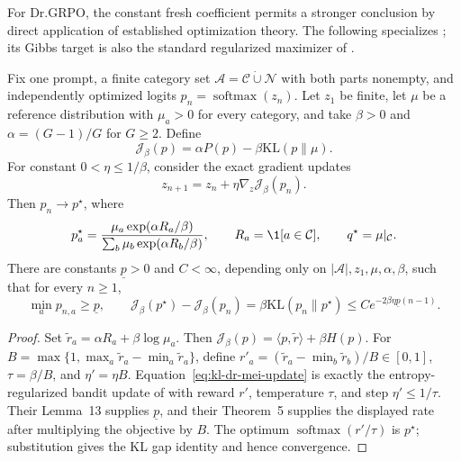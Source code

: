 For Dr.GRPO, the constant fresh coefficient permits a stronger conclusion
by direct application of established optimization theory. The following
specializes \citet[Theorem~5 and Lemma~13]{mei2020softmaxpg}; its Gibbs
target is also the standard regularized maximizer of
\citet[Proposition~1]{geist2019regmdp}.

\begin{corollary}
\enforcehalffinalproseline
\label{cor:kl-dr-mei-convergence}
Fix one prompt, a finite category set
$\mathcal A=\mathcal C\mathbin{\dot\cup}\mathcal N$ with both parts
nonempty, and independently optimized logits $p_n=\operatorname{softmax}(z_n)$.
Let $z_1$ be finite, let $\mu$ be a reference distribution with
$\mu_a>0$ for every category, and take $\beta>0$ and
$\alpha=(G-1)/G$ for $G\ge2$. Define
\[
 \mathcal J_\beta(p)=\alpha P(p)-\beta\mathrm{KL}(p\|\mu).
\]
For constant $0<\eta\le1/\beta$, consider the exact gradient updates
\begin{equation}
 z_{n+1}=z_n+\eta\nabla_z\mathcal J_\beta(p_n).
 \label{eq:kl-dr-mei-update}
\end{equation}
Then $p_n\to p^\star$, where
\[
 p^\star_a=
 \frac{\mu_a\exp(\alpha R_a/\beta)}
      {\sum_b\mu_b\exp(\alpha R_b/\beta)},
 \qquad R_a=\1[a\in\mathcal C],
 \qquad q^\star=\mu|_{\mathcal C}.
\]
There are constants $\underline p>0$ and $C<\infty$, depending only on
$|\mathcal A|,z_1,\mu,\alpha,\beta$, such that for every $n\ge1$,
\begin{equation}
 \min_a p_{n,a}\ge\underline p,
 \qquad
 \mathcal J_\beta(p^\star)-\mathcal J_\beta(p_n)
 =\beta\mathrm{KL}(p_n\|p^\star)
 \le C e^{-2\beta\eta\underline p(n-1)}.
 \label{eq:kl-dr-mei-rate}
\end{equation}
\end{corollary}

\begin{proof}
\enforcehalffinalproseline
Set $\widetilde r_a=\alpha R_a+\beta\log\mu_a$. Then
$\mathcal J_\beta(p)=\langle p,\widetilde r\rangle+\beta H(p)$.
For $B=\max\{1,\max_a\widetilde r_a-\min_a\widetilde r_a\}$, define
$r'_a=(\widetilde r_a-\min_b\widetilde r_b)/B\in[0,1]$,
$\tau=\beta/B$, and $\eta'=\eta B$. Equation~\eqref{eq:kl-dr-mei-update}
is exactly the entropy-regularized bandit update of
\citet{mei2020softmaxpg} with reward $r'$, temperature $\tau$, and step
$\eta'\le1/\tau$. Their Lemma~13 supplies $\underline p$, and their
Theorem~5 supplies the displayed rate after multiplying the objective by
$B$. The optimum $\operatorname{softmax}(r'/\tau)$ is $p^\star$;
substitution gives the KL gap identity and hence convergence.
\end{proof}

